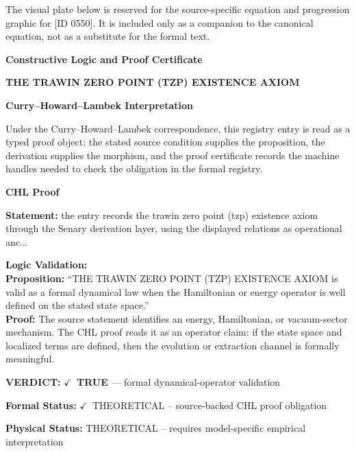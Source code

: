 \begingroup\footnotesize\sloppy
The visual plate below is reserved for the source-specific equation and progression graphic for [ID 0550]. It is included only as a companion to the canonical equation, not as a substitute for the formal text.
\par\endgroup
\ifTZPDarkEdition
{}
\fi

\clearpage
\begingroup\tzpsupportsetup
\noindent\textbf{\fontsize{10.8pt}{12.8pt}\selectfont [ID 0550] Constructive Logic and Proof Certificate}\par
\noindent\textbf{\fontsize{10pt}{12pt}\selectfont THE TRAWIN ZERO POINT (TZP) EXISTENCE AXIOM}\par
\vspace{0.45em}
\begingroup
\footnotesize
\setlength{\parskip}{0.22em}
\setlength{\parindent}{0pt}
\noindent\textbf{Curry--Howard--Lambek Interpretation}\par
Under the Curry--Howard--Lambek correspondence, this registry entry is read as a typed proof
object: the stated source condition supplies the proposition, the derivation supplies the
morphism, and the proof certificate records the machine handles needed to check the obligation
in the formal registry.

\vspace{0.45em}
\noindent\textbf{CHL Proof}\par
\textbf{Statement:} the entry records the trawin zero point (tzp) existence axiom through the Senary
derivation layer, using the displayed relations as operational anc...

\textbf{Logic Validation:}\\
\textbf{Proposition:} ``THE TRAWIN ZERO POINT (TZP) EXISTENCE AXIOM is valid as a formal dynamical law when the
Hamiltonian or energy operator is well defined on the stated state space.''\\
\textbf{Proof:} The source statement identifies an energy, Hamiltonian, or vacuum-sector mechanism. The
CHL proof reads it as an operator claim: if the state space and localized terms are
defined, then the evolution or extraction channel is formally meaningful.

\textbf{VERDICT:} \ensuremath{\checkmark}\ \textbf{TRUE} --- formal dynamical-operator validation

\textbf{Formal Status:} \ensuremath{\checkmark}\ THEORETICAL -- source-backed CHL proof obligation

\textbf{Physical Status:} THEORETICAL -- requires model-specific empirical interpretation
\par\vspace{0.45em}
\par
\ifTZPDarkEdition
{}
\fi
\endgroup
\endgroup
